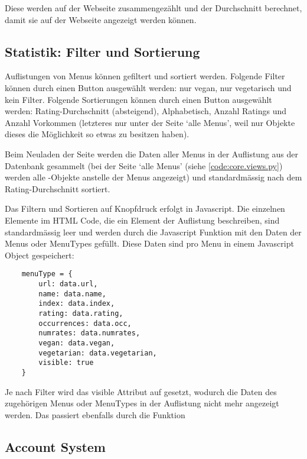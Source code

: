Diese werden auf der Webseite zusammengezählt und der Durchschnitt berechnet,
damit sie auf der Webseite angezeigt werden können.


\subsection{Statistik: Filter und Sortierung} \label{spez:Statistik}

Auflistungen von Menus können gefiltert und sortiert werden. Folgende Filter
können durch einen Button ausgewählt werden: nur vegan, nur vegetarisch und kein
Filter. Folgende Sortierungen können durch einen Button ausgewählt werden:
Rating-Durchschnitt (absteigend), Alphabetisch, Anzahl Ratings und Anzahl
Vorkommen (letzteres nur unter der Seite `alle Menus', weil nur 
Objekte dieses die Möglichkeit so etwas zu besitzen haben).

Beim Neuladen der Seite werden die Daten aller Menus in der Auflistung aus der
Datenbank gesammelt (bei der Seite `alle Menus' (siehe \ref{code:core.views.py})
werden alle -Objekte anstelle der Menus angezeigt) und
standardmässig nach dem Rating-Durchschnitt sortiert. 

Das Filtern und Sortieren auf Knopfdruck erfolgt in Javascript. Die einzelnen
 Elemente im HTML Code, die ein Element der Auflistung beschreiben,
sind standardmässig leer und werden durch die Javascript Funktion
 mit den Daten der Menus oder MenuTypes gefüllt. Diese Daten sind pro
Menu in einem Javascript Object gespeichert:

\begin{lstlisting}
    menuType = {
        url: data.url,
        name: data.name,
        index: data.index,
        rating: data.rating,
        occurrences: data.occ,
        numrates: data.numrates,
        vegan: data.vegan,
        vegetarian: data.vegetarian,
        visible: true
    }
\end{lstlisting}

Je nach Filter wird das visible Attribut auf  gesetzt, wodurch die
Daten des zugehörigen Menus oder MenuTypes in der Auflistung nicht mehr
angezeigt werden. Das passiert ebenfalls durch die  Funktion

\subsection{Account System} \label{spez:Account}

